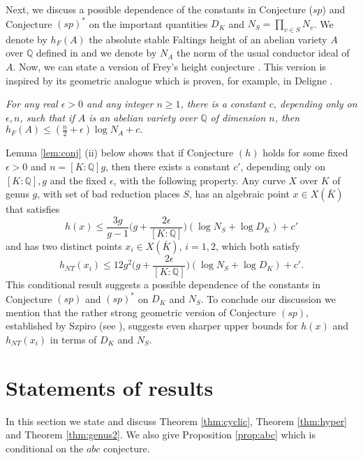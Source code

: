 \documentclass[11pt]{article}
\numberwithin{equation}{section}
\newcommand {\QQ}  {{\mathbb Q}}
\newcommand {\cc} {sp}
\newcommand {\bb} {(sp)^*}
\begin{document}
Next, we discuss a possible dependence of the constants in Conjecture ($\cc$) and Conjecture $\bb$ on the important quantities $D_K$ and $N_S=\prod_{v\in S}N_v$.  We denote by $h_F(A)$  the absolute stable Faltings height of an abelian variety $A$ over $\QQ$ defined in \cite[p.354]{faltings:finiteness} and we denote by $N_A$ the norm of the usual conductor ideal of $A$. Now, we can state a version of Frey's height conjecture \cite[p.39]{frey:linksulm}. This version is inspired by its geometric analogue which is proven, for example, in Deligne \cite[p.14]{deligne:monodromie}.

\vspace{0.3cm}
\emph{For any real $\epsilon>0$ and any integer $n\geq 1$, there is a constant $c$, depending only on $\epsilon,n$, such that if  $A$ is an abelian variety over $\QQ$ of dimension $n$, then $h_F(A)\leq (\frac{n}{2}+\epsilon)\log N_A+c.$\vspace{0.3cm}}

Lemma \ref{lem:conj} (ii) below shows that if Conjecture $(h)$ holds for some fixed $\epsilon>0$ and $n=[K:\QQ]g$, then there exists a constant $c'$, depending only on $[K:\QQ],g$ and the fixed $\epsilon$, with the following property. 
Any curve $X$ over $K$ of genus $g$, with set of bad reduction places $S$, has an algebraic point $x\in X(\bar{K})$ that satisfies $$ h(x)\leq \frac{3g}{g-1}\bigl(g+\frac{2\epsilon}{[K:\QQ]}\bigl)(\log N_S+\log D_K)+c'$$
and has two distinct points $x_i\in X(\bar{K})$, $i=1,2$, which both satisfy
$$ h_{NT}(x_i)\leq 12g^2\bigl(g+\frac{2\epsilon}{[K:\QQ]}\bigl)(\log N_S+\log D_K)+c'.$$
This conditional result suggests a possible dependence  of the constants in Conjecture $(\cc)$ and  $\bb$ on $D_K$ and $N_S$. To conclude our discussion we mention that the rather strong geometric version of Conjecture $(sp)$, established by Szpiro (see \cite[p.101]{szpiro:faltings}), suggests even sharper upper bounds for $h(x)$ and $h_{NT}(x_i)$ in terms of $D_K$ and $N_S$.



\section{Statements of results}\label{sec:results}
In this section we state and discuss  Theorem \ref{thm:cyclic}, Theorem \ref{thm:hyper} and Theorem \ref{thm:genus2}. We also give Proposition \ref{prop:abc} which is conditional on the $abc$ conjecture.
\end{document}

